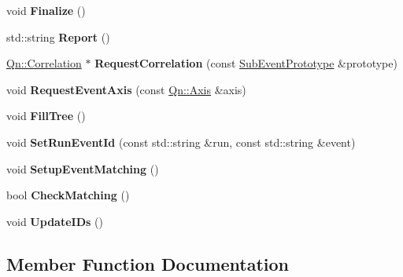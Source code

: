 \begin{DoxyCompactItemize}
\item 
\mbox{\label{classQn_1_1EseHandler_ab21cb6361b59abdd561c8d699b306c0e}} 
void {\bfseries Finalize} ()
\item 
\mbox{\label{classQn_1_1EseHandler_ac2fadcf9fe900fa85bf45e7baba0c7b6}} 
std\+::string {\bfseries Report} ()
\item 
\mbox{\label{classQn_1_1EseHandler_a439a4135d422cf6ff02ed423fc6d3027}} 
\mbox{\hyperlink{classQn_1_1Correlation}{Qn\+::\+Correlation}} $\ast$ {\bfseries Request\+Correlation} (const \mbox{\hyperlink{structQn_1_1SubEventPrototype}{Sub\+Event\+Prototype}} \&prototype)
\item 
\mbox{\label{classQn_1_1EseHandler_a873146ccc642528b792f6ac37a01d8ff}} 
void {\bfseries Request\+Event\+Axis} (const \mbox{\hyperlink{classQn_1_1Axis}{Qn\+::\+Axis}} \&axis)
\item 
\mbox{\label{classQn_1_1EseHandler_aac107400e625db5e486916fc319c5c6a}} 
void {\bfseries Fill\+Tree} ()
\item 
\mbox{\label{classQn_1_1EseHandler_a254210229fd9fee761db873cbc4ecb95}} 
void {\bfseries Set\+Run\+Event\+Id} (const std\+::string \&run, const std\+::string \&event)
\item 
\mbox{\label{classQn_1_1EseHandler_a27ac3d056224ad8860498ecb5ac28cbc}} 
void {\bfseries Setup\+Event\+Matching} ()
\item 
\mbox{\label{classQn_1_1EseHandler_a6c36a5bf30214de0ba6c075d559dcf22}} 
bool {\bfseries Check\+Matching} ()
\item 
\mbox{\label{classQn_1_1EseHandler_a158f5b4c4e3b590adea0d4bbfbb8a708}} 
void {\bfseries Update\+I\+Ds} ()
\end{DoxyCompactItemize}


\subsection{Member Function Documentation}
\mbox{\label{classQn_1_1EseHandler_abf21f1c9e2e1a2c27d6b1ab47ec68129}} 
